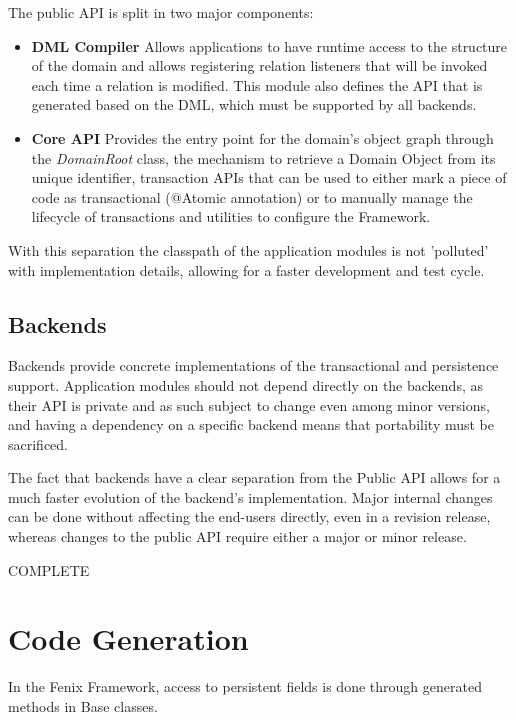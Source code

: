The public API is split in two major components:

\begin{itemize}
\item {\bf DML Compiler} Allows applications to have runtime access to
  the structure of the domain and allows registering relation
  listeners that will be invoked each time a relation is
  modified. This module also defines the API that is generated based
  on the DML, which must be supported by all backends.

\item {\bf Core API} Provides the entry point for the domain's object
graph through the {\it DomainRoot} class, the mechanism to retrieve a
Domain Object from its unique identifier, transaction APIs that can be
used to either mark a piece of code as transactional (@Atomic
annotation) or to manually manage the lifecycle of transactions and
utilities to configure the Framework.
\end{itemize}

With this separation the classpath of the application modules is not
'polluted' with implementation details, allowing for a faster
development and test cycle.

\subsection{Backends}

Backends provide concrete implementations of the transactional and
persistence support. Application modules should not depend directly on
the backends, as their API is private and as such subject to change
even among minor versions, and having a dependency on a specific
backend means that portability must be sacrificed.

The fact that backends have a clear separation from the Public API
allows for a much faster evolution of the backend's
implementation. Major internal changes can be done without affecting
the end-users directly, even in a revision release, whereas changes to
the public API require either a major or minor release. 

COMPLETE

\section{Code Generation}
\label{sec:codeGen}

In the Fenix Framework, access to persistent fields is done through
generated methods in Base classes. 

